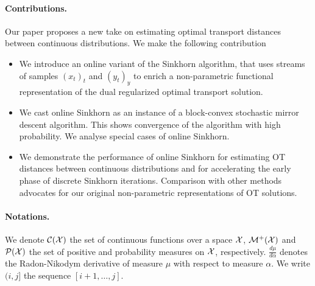 \paragraph{Contributions.} Our paper proposes a new take on estimating optimal transport distances between continuous distributions. We make the following contribution
\begin{itemize}
    \item We introduce an online variant of the Sinkhorn algorithm, that uses
    streams of samples $(x_t)_t$ and $(y_t)_y$ to enrich a non-parametric
    functional representation of the dual regularized optimal transport solution.
    \item We cast online Sinkhorn as an instance of a block-convex stochastic mirror
    descent algorithm. This shows convergence of the algorithm
    with high probability. We analyse special cases of online Sinkhorn.
    \item We demonstrate the performance of online Sinkhorn for estimating OT
    distances between continuous distributions and for accelerating the early phase of discrete Sinkhorn iterations. Comparison with other methods advocates for our original non-parametric representations of OT solutions.
\end{itemize}

\paragraph{Notations.} We denote $\mathcal{C}(\mathcal{X})$ the set of continuous functions over
a space $\mathcal{X}$, $\mathcal{M}^+(\mathcal{X})$ and $\mathcal{P}(\mathcal{X})$ the set of positive and probability
measures on $\mathcal{X}$, respectively. $\frac{d \mu}{d \alpha}$ denotes the
Radon-Nikodym derivative of measure $\mu$ with respect to measure $\alpha$. We
write $(i, j]$ the sequence $[i+1, \dots, j]$.


